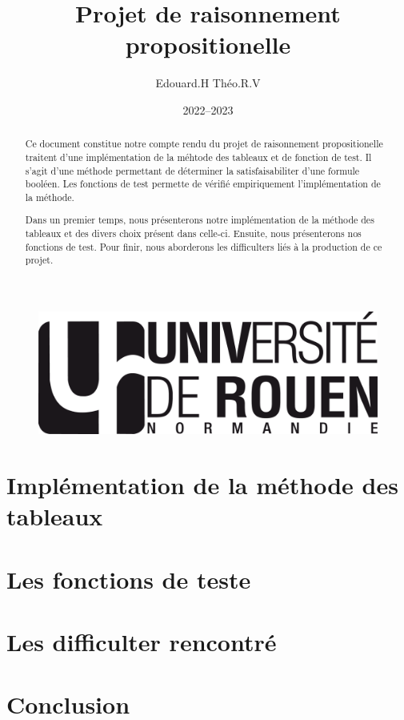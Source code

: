 \documentclass[12pt]{article}
\title{Projet de raisonnement propositionelle}
\author{Edouard.H Théo.R.V}
\date{2022--2023}
\begin{document}
    \begin{figure}
        \includegraphics[scale=0.3, right]{logo-univ-rouen-normandie-noir.png}
    \end{figure}

    \maketitle

    \begin{abstract}
        Ce document constitue notre compte rendu du projet de raisonnement
        propositionelle traitent d'une implémentation de la méhtode des 
        tableaux et de fonction de test. Il s'agit d'une méthode permettant de 
        déterminer la satisfaisabiliter d'une formule booléen. Les fonctions de 
        test permette de vérifié empiriquement l'implémentation de la méthode.  
        
        Dans un premier temps, nous présenterons notre implémentation de la 
        méthode des tableaux et des divers choix présent dans celle-ci. Ensuite,
        nous présenterons nos fonctions de test. Pour finir, nous aborderons les
        difficulters liés à la production de ce projet.
    \end{abstract}

    \newpage

    \tableofcontents

    \newpage

    \section{Implémentation de la méthode des tableaux}
    \section{Les fonctions de teste}
    \section{Les difficulter rencontré}
    \section{Conclusion}
\end{document}
